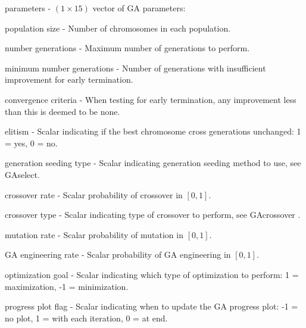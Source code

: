 \documentclass{book}
\newcommand{\textcode}[1]{\textsf{\small #1}}   %
\begin{document}
\begin{compactitem}

\item \textcode{parameters} - $\left( 1 \times 15 \right)$ vector of GA parameters:
\begin{compactenum}

\item \textcode{population size} - Number of chromosomes in each
population.

\item \textcode{number generations} - Maximum number of
generations to perform.

\item \textcode{minimum number generations} -
Number of generations with insufficient improvement for early
termination.

\item \textcode{convergence criteria} - When testing for
early termination, any improvement less than this is deemed to be
none.

\item \textcode{elitism} - Scalar indicating if the best chromosome
cross generations unchanged: 1 = yes, 0 = no.

\item \textcode{generation
seeding type} - Scalar indicating generation seeding method to use, see
\textcode{GAselect}.

\item \textcode{crossover rate} - Scalar probability
of crossover in $\left[ 0,1 \right]$.

\item \textcode{crossover type} -
Scalar indicating type of crossover to perform, see \textcode{GAcrossover}%
.

\item \textcode{mutation rate} - Scalar probability of mutation in $%
\left[ 0,1 \right]$.

\item \textcode{GA engineering rate} - Scalar
probability of GA engineering in $\left[ 0,1 \right]$.

\item \textcode{%
optimization goal} - Scalar indicating which type of optimization to
perform: 1 = maximization, -1 = minimization.

\item \textcode{progress
plot flag} - Scalar indicating when to update the GA progress plot: -1 = no
plot, 1 = with each iteration, 0 = at end.


\end{compactenum}
\end{compactitem}
\end{document}
